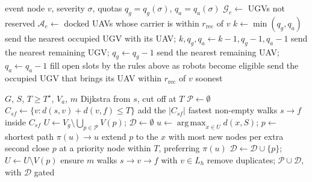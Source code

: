 \documentclass[11pt]{article}
\DeclareMathOperator*{\argmax}{arg\,max}
\theoremstyle{definition}
\theoremstyle{plain}
\begin{document}
\begin{algorithm}[H]
\caption{Event responder selection}
\label{alg:respond}
\begin{algorithmic}[1]
\Require event node $v$, severity $\sigma$, quotas $q_g = q_g(\sigma)$, $q_a = q_a(\sigma)$
\State $\mathcal{G}_e \gets$ UGVs not reserved
\State $\mathcal{A}_e \gets$ docked UAVs whose carrier is within $r_{\mathrm{rec}}$ of $v$
\State $k \gets \min(q_g, q_a)$
  \State send the nearest occupied UGV with its UAV; $k, q_g, q_a \gets k-1, q_g-1, q_a-1$
\EndWhile
{}
  \State send the nearest remaining UGV; $q_g \gets q_g - 1$
\EndWhile
{}
  \State send the nearest remaining UAV; $q_a \gets q_a - 1$
\EndWhile
{} 
  \State fill open slots by the rules above as robots become eligible
    \State send the occupied UGV that brings its UAV within $r_{\mathrm{rec}}$ of $v$ soonest
  \EndIf
\EndWhile
\end{algorithmic}
\end{algorithm}

\begin{algorithm}[H]
\caption{Covering walk set (offline)}
\label{alg:cover}
\begin{algorithmic}[1]
\Require $G$, $S$, $T \geq T^\star$, $V_a$, $m$
 Dijkstra from $s$, cut off at $T$ \EndFor
\State $\mathcal{P} \gets \emptyset$
  \State $C_{sf} \gets \{ v : d(s, v) + d(v, f) \leq T \}$
  \State add the $|C_{sf}|$ fastest non-empty walks $s \to f$ inside $C_{sf}$
\EndFor
\State $U \gets V_g \setminus \bigcup_{p \in \mathcal{P}} V(p)$; $\mathcal{D} \gets \emptyset$
  \State $u \gets \argmax_{x \in U} d(x, S)$; $p \gets$ shortest path $\pi(u) \to u$
    \State extend $p$ to the $x$ with most new nodes per extra second
  \EndWhile
  \State close $p$ at a priority node within $T$, preferring $\pi(u)$
  \State $\mathcal{D} \gets \mathcal{D} \cup \{p\}$; $U \gets U \setminus V(p)$
\EndWhile
{} ensure $m$ walks $s \to v \to f$ with $v \in L_h$ \EndFor
\State remove duplicates; \Return $\mathcal{P} \cup \mathcal{D}$, with $\mathcal{D}$ gated
\end{algorithmic}
\end{algorithm}
\end{document}
